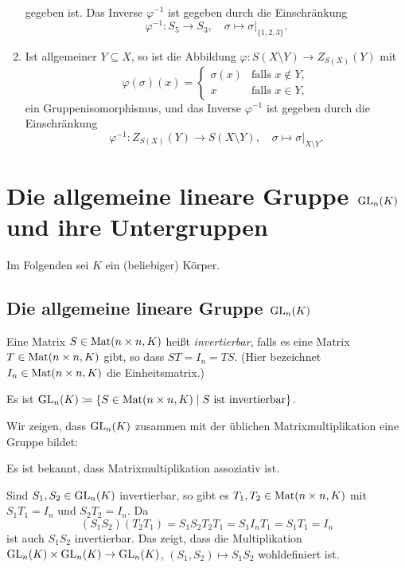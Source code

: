 \begin{bsp}
\begin{enumerate}[leftmargin=*]
\begin{align*}
   \end{align*}
   gegeben ist. Das Inverse $\varphi^{-1}$ ist gegeben durch die Einschränkung
   \[
    \varphi^{-1} \colon S_5 \to S_3,
    \quad
    \sigma \mapsto \sigma|_{\{1,2,3\}}.
   \]
  \item
   Ist allgemeiner $Y \subseteq X$, so ist die Abbildung $\varphi \colon S(X \setminus Y) \to Z_{S(X)}(Y)$ mit
   \[
    \varphi(\sigma)(x) =
    \begin{cases}
     \sigma(x) & \text{falls $x \notin Y$}, \\
            x  & \text{falls $x \in Y$},
    \end{cases}
   \]
   ein Gruppenisomorphismus, und das Inverse $\varphi^{-1}$ ist gegeben durch die Einschränkung
   \[
    \varphi^{-1} \colon Z_{S(X)}(Y) \to S(X \setminus Y),
    \quad
    \sigma \mapsto \sigma|_{X \setminus Y}.
   \]
 \end{enumerate}
\end{bsp}






\section{Die allgemeine lineare Gruppe \texorpdfstring{$\mathrm{GL}_n(K)$}{GLnK} und ihre Untergruppen}
Im Folgenden sei $K$ ein (beliebiger) Körper.



\subsection{Die allgemeine lineare Gruppe \texorpdfstring{$\mathrm{GL}_n(K)$}{GLnK}}

\begin{defi}
 Eine Matrix $S \in \mathrm{Mat}(n \times n, K)$ heißt \emph{invertierbar}, falls es eine Matrix $T \in \mathrm{Mat}(n \times n, K)$ gibt, so dass $ST = I_n = TS$. (Hier bezeichnet $I_n \in \mathrm{Mat}(n \times n, K)$ die Einheitsmatrix.)
 
 Es ist $\mathrm{GL}_n(K) \coloneqq \{S \in \mathrm{Mat}(n \times n, K) \mid \text{$S$ ist invertierbar}\}$.
\end{defi}

Wir zeigen, dass $\mathrm{GL}_n(K)$ zusammen mit der üblichen Matrixmultiplikation eine Gruppe bildet:

Es ist bekannt, dass Matrixmultiplikation assoziativ ist.

Sind $S_1, S_2 \in \mathrm{GL}_n(K)$ invertierbar, so gibt es $T_1, T_2 \in \mathrm{Mat}(n \times n, K)$ mit $S_1 T_1 = I_n$ und $S_2 T_2 = I_n$. Da
\[
 (S_1 S_2) (T_2 T_1)
 = S_1 S_2 T_2 T_1
 = S_1 I_n T_1
 = S_1 T_1
 = I_n
\]
ist auch $S_1 S_2$ invertierbar. Das zeigt, dass die Multiplikation $\mathrm{GL}_n(K) \times \mathrm{GL}_n(K) \to \mathrm{GL}_n(K)$, $(S_1, S_2) \mapsto S_1 S_2$ wohldefiniert ist.

